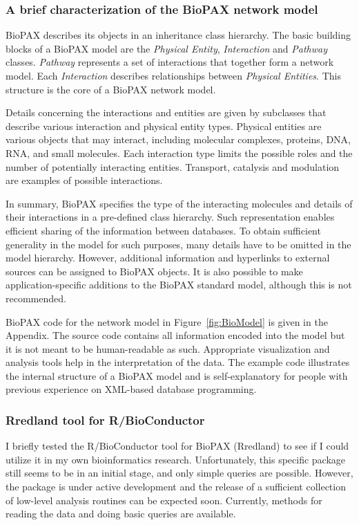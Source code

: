\documentclass[a4paper,10pt,titlepage]{article}
\begin{document}
\subsubsection{A brief characterization of the BioPAX network model}

BioPAX describes its objects in an inheritance class hierarchy. The basic building blocks of a BioPAX model are the {\it Physical Entity}, {\it Interaction} and {\it Pathway} classes. {\it Pathway} represents a set of interactions that together form a network model. Each {\it Interaction} describes relationships between {\it Physical Entities}. This structure is the core of a BioPAX network model. 

Details concerning the interactions and entities are given by subclasses that describe various interaction and physical entity types. Physical entities are various objects that may interact, including molecular complexes, proteins, DNA, RNA, and small molecules. Each interaction type limits the possible roles and the number of potentially interacting entities. Transport, catalysis and modulation are examples of possible interactions. 

In summary, BioPAX specifies the type of the interacting molecules and details of their interactions in a pre-defined class hierarchy. Such representation enables efficient sharing of the information between databases. To obtain sufficient generality in the model for such purposes, many details have to be omitted in the model hierarchy. However, additional information and hyperlinks to external sources can be assigned to BioPAX objects. It is also possible to make application-specific additions to the BioPAX standard model, although this is not recommended.

BioPAX code for the network model in Figure~\ref{fig:BioModel} is given in the Appendix. The source code contains all information encoded into the model but it is not meant to be human-readable as such. Appropriate visualization and analysis tools help in the interpretation of the data. The example code illustrates the internal structure of a BioPAX model and is self-explanatory for people with previous experience on XML-based database programming.

\subsubsection{Rredland tool for R/BioConductor}

I briefly tested the R/BioConductor tool for BioPAX (Rredland) to see if I could utilize it in my own bioinformatics research. Unfortunately, this specific package still seems to be in an initial stage, and only simple queries are possible. However, the package is under active development and the release of a sufficient collection of low-level analysis routines can be expected soon. Currently, methods for reading the data and doing basic queries are available.
\end{document}
